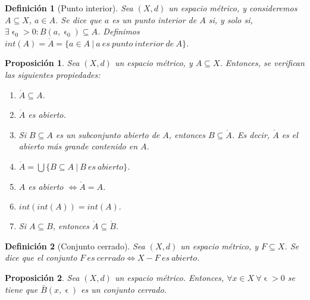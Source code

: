 \documentclass[11pt, a4paper, titlepage]{article}
\let\epsilon\upvarepsilon
\theoremstyle{theorem-style}
\newtheorem*{nprop}{Proposición}
\theoremstyle{definition-style}
\newtheorem*{ndef}{Definición}
\theoremstyle{remark-style}
\theoremstyle{example-style}
\newenvironment{nlist}
{\begin{enumerate}
\renewcommand\labelenumi{(\emph{\roman{enumi})}}}
{\end{enumerate}}
\begin{document}
\begin{ndef}[Punto interior]
Sea $(X,d)$ un espacio métrico, y consideremos $A\subseteq X$, $a\in A$. Se dice que $a$ \emph{es un punto interior de} $A$ si, y solo si, $\exists \epsilon_0 > 0: B(a,\epsilon_0)\subseteq A$.  Definimos $int(A) = \mathring{A} = \{ a\in A \ | \ a\ es\ punto\ interior\ de\ A\}$.
\end{ndef}



\begin{nprop}
Sea $(X,d)$ un espacio métrico, y $A\subseteq X$. Entonces, se verifican las siguientes propiedades:

\begin{nlist}
\item $\mathring{A} \subseteq A$.

\item $\mathring{A}$ es abierto.

\item Si $B\subseteq A$ es un subconjunto abierto de $A$, entonces $B \subseteq \mathring{A}$. Es decir, $\mathring{A}$ es el abierto más grande contenido en $A$.

\item $\displaystyle \mathring{A}  = \bigcup \{ B\subseteq A \ | \ B\ es\ abierto \}$.

\item $A$ es abierto $\iff \mathring{A} =A$.

\item $int(int(A)) = int(A).$

\item Si $A\subseteq B$, entonces $\mathring{A} \subseteq \mathring{B}$.
\end{nlist}

\end{nprop}



\begin{ndef}[Conjunto cerrado]
Sea $(X,d)$ un espacio métrico, y $F\subseteq X$. Se dice que el conjunto $F\ es\ cerrado \iff X-F\ es\ abierto$.
\end{ndef}



\begin{nprop}
Sea $(X,d)$ un espacio métrico. Entonces, $\forall x\in X \ \forall \epsilon > 0$ se tiene que $\bar{B}(x,\epsilon)$ es un conjunto cerrado.
\end{nprop}
\end{document}
